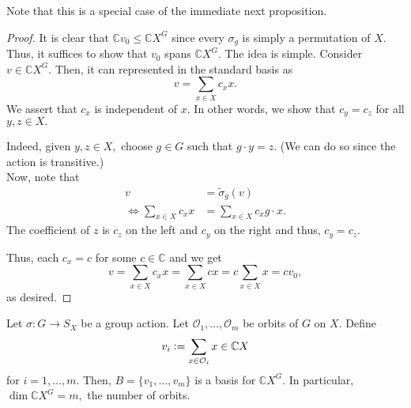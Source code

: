 Note that this is a special case of the immediate next proposition.

\begin{proof} 
	It is clear that $\mathbb{C}v_0 \le \mathbb{C}X^G$ since every $\sigma_g$ is simply a permutation of $X.$ Thus, it suffices to show that $v_0$ spans $\mathbb{C}X^G.$ The idea is simple. Consider $v \in \mathbb{C}X^G.$ Then, it can represented in the standard basis as
	\begin{equation*} 
		v = \sum_{x \in X} c_x x.
	\end{equation*}
	We assert that $c_x$ is independent of $x.$ In other words, we show that $c_y = c_z$ for all $y, z \in X.$

	Indeed, given $y, z \in X,$ choose $g \in G$ such that $g \cdot y = z.$ (We can do so since the action is transitive.) \\
	Now, note that
	\begin{align*} 
		v &= \widetilde{\sigma}_g(v)\\
		\iff \sum_{x \in X} c_x x &= \sum_{x \in X} c_x g \cdot x.
	\end{align*}
	The coefficient of $z$ is $c_z$ on the left and $c_y$ on the right and thus, $c_y = c_z.$

	Thus, each $c_x = c$ for some $c \in \mathbb{C}$ and we get
	\begin{equation*} 
		v = \sum_{x \in X} c_x x = \sum_{x \in X} c x = c\sum_{x \in X} x = cv_0,
	\end{equation*}
	as desired.
\end{proof}

\begin{prop} \label{prop:numberoforbitsisfixeddim}
	Let $\sigma : G \to S_X$ be a group action. Let $\mathcal{O}_1, \ldots, \mathcal{O}_m$ be orbits of $G$ on $X.$ Define
	\begin{equation*} 
		v_i \vcentcolon= \sum_{x \in \mathcal{O}_i} x \in \mathbb{C}X
	\end{equation*} 
	for $i = 1, \ldots, m.$ Then, $B = \{v_1, \ldots, v_m\}$ is a basis for $\mathbb{C}X^G.$ In particular, $\dim \mathbb{C}X^G = m,$ the number of orbits.
\end{prop}


